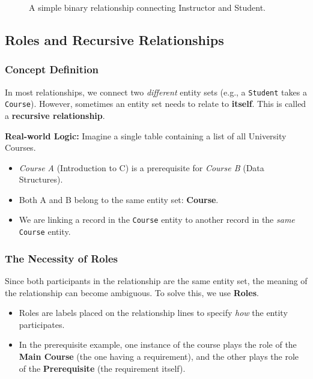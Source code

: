 \documentclass[12pt,a4paper]{article}
\begin{document}
\begin{figure}[H]
    \centering
    \caption{A simple binary relationship connecting Instructor and Student.}
\end{figure}
\subsection{Roles and Recursive Relationships}

\subsubsection{Concept Definition}
In most relationships, we connect two \textit{different} entity sets (e.g., a \texttt{Student} takes a \texttt{Course}). However, sometimes an entity set needs to relate to \textbf{itself}. This is called a \textbf{recursive relationship}.

\textbf{Real-world Logic:}
Imagine a single table containing a list of all University Courses.
\begin{itemize}
    \item \textit{Course A} (Introduction to C) is a prerequisite for \textit{Course B} (Data Structures).
    \item Both A and B belong to the same entity set: \textbf{Course}.
    \item We are linking a record in the \texttt{Course} entity to another record in the \textit{same} \texttt{Course} entity.
\end{itemize}

\subsubsection{The Necessity of Roles}
Since both participants in the relationship are the same entity set, the meaning of the relationship can become ambiguous. To solve this, we use \textbf{Roles}.
\begin{itemize}
    \item Roles are labels placed on the relationship lines to specify \textit{how} the entity participates.
    \item In the prerequisite example, one instance of the course plays the role of the \textbf{Main Course} (the one having a requirement), and the other plays the role of the \textbf{Prerequisite} (the requirement itself).
\end{itemize}
\end{document}
